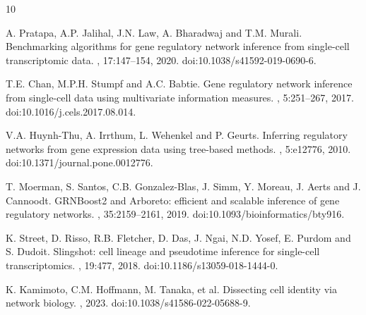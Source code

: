 \documentclass[unnumsec,webpdf,modern,large]{oup-authoring-template}%
\begin{document}
\begin{thebibliography}{10}

A. Pratapa, A.P. Jalihal, J.N. Law, A. Bharadwaj and T.M. Murali.
\newblock Benchmarking algorithms for gene regulatory network inference from single-cell transcriptomic data.
, 17:147--154, 2020. doi:10.1038/s41592-019-0690-6.

T.E. Chan, M.P.H. Stumpf and A.C. Babtie.
\newblock Gene regulatory network inference from single-cell data using multivariate information measures.
, 5:251--267, 2017. doi:10.1016/j.cels.2017.08.014.

V.A. Huynh-Thu, A. Irrthum, L. Wehenkel and P. Geurts.
\newblock Inferring regulatory networks from gene expression data using tree-based methods.
, 5:e12776, 2010. doi:10.1371/journal.pone.0012776.

T. Moerman, S. Santos, C.B. Gonzalez-Blas, J. Simm, Y. Moreau, J. Aerts and J. Cannoodt.
\newblock GRNBoost2 and Arboreto: efficient and scalable inference of gene regulatory networks.
, 35:2159--2161, 2019. doi:10.1093/bioinformatics/bty916.

K. Street, D. Risso, R.B. Fletcher, D. Das, J. Ngai, N.D. Yosef, E. Purdom and S. Dudoit.
\newblock Slingshot: cell lineage and pseudotime inference for single-cell transcriptomics.
, 19:477, 2018. doi:10.1186/s13059-018-1444-0.

K. Kamimoto, C.M. Hoffmann, M. Tanaka, et al.
\newblock Dissecting cell identity via network biology.
, 2023. doi:10.1038/s41586-022-05688-9.

\end{thebibliography}
\end{document}
